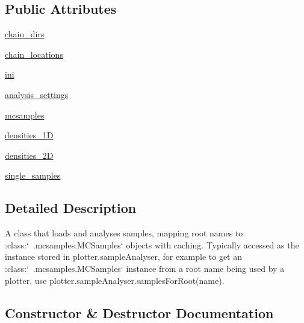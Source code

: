 \subsection*{Public Attributes}
\begin{DoxyCompactItemize}
\item 
\mbox{\hyperlink{classgetdist_1_1plots_1_1MCSampleAnalysis_a1822d8859d98c2ecae909fc49eda82fa}{chain\+\_\+dirs}}
\item 
\mbox{\hyperlink{classgetdist_1_1plots_1_1MCSampleAnalysis_a23dbb7ae143679e678d0c82f2411d51e}{chain\+\_\+locations}}
\item 
\mbox{\hyperlink{classgetdist_1_1plots_1_1MCSampleAnalysis_ad8ae1e04c9f3be4b9246dd83e73551ae}{ini}}
\item 
\mbox{\hyperlink{classgetdist_1_1plots_1_1MCSampleAnalysis_ab59fb51c6d446e1cb3ffb9b6b2ab257f}{analysis\+\_\+settings}}
\item 
\mbox{\hyperlink{classgetdist_1_1plots_1_1MCSampleAnalysis_a5790d00b57a55b123b63fe42c5a65006}{mcsamples}}
\item 
\mbox{\hyperlink{classgetdist_1_1plots_1_1MCSampleAnalysis_a3c60ec48c3de0a16aa8faf0ab9ceb47e}{densities\+\_\+1D}}
\item 
\mbox{\hyperlink{classgetdist_1_1plots_1_1MCSampleAnalysis_a6b2c5ec08aee2a0123799325008b9a64}{densities\+\_\+2D}}
\item 
\mbox{\hyperlink{classgetdist_1_1plots_1_1MCSampleAnalysis_a870b19f6395bcb2ab86cbbb606bc223d}{single\+\_\+samples}}
\end{DoxyCompactItemize}


\subsection{Detailed Description}
\begin{DoxyVerb}A class that loads and analyses samples, mapping root names to :class:`~.mcsamples.MCSamples` objects with caching.
Typically accessed as the instance stored in plotter.sampleAnalyser, for example to 
get an :class:`~.mcsamples.MCSamples` instance from a root name being used by a plotter, use plotter.sampleAnalyser.samplesForRoot(name).
\end{DoxyVerb}
 

\subsection{Constructor \& Destructor Documentation}
\mbox{\label{classgetdist_1_1plots_1_1MCSampleAnalysis_a85dad878c7c3532d966f0d46188a8ab1}} 
